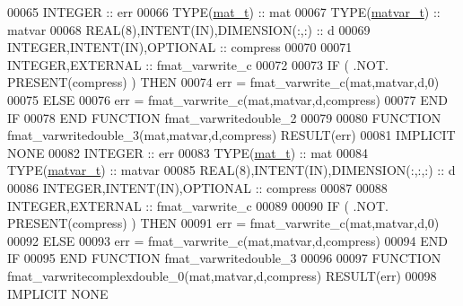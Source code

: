 \begin{DoxyCode}
00065     \textcolor{keywordtype}{INTEGER}                                  :: err
00066     \textcolor{keywordtype}{TYPE}(\hyperlink{group___m_a_t_gab0fc888f5a5d79943b16284b1f91c2e8}{mat\_t})                              :: mat
00067     \textcolor{keywordtype}{TYPE}(\hyperlink{group___m_a_t_structmatvar__t}{matvar\_t})                           :: matvar
00068     \textcolor{keywordtype}{REAL(8)},\textcolor{keywordtype}{INTENT(IN)},\textcolor{keywordtype}{DIMENSION(:,:)}        :: d
00069     \textcolor{keywordtype}{INTEGER},\textcolor{keywordtype}{INTENT(IN)},\textcolor{keywordtype}{OPTIONAL}              :: compress
00070 
00071     \textcolor{keywordtype}{INTEGER},\textcolor{keywordtype}{EXTERNAL}                         :: fmat\_varwrite\_c
00072 
00073     \textcolor{keywordflow}{IF} ( .NOT. \textcolor{keyword}{PRESENT}(compress) ) \textcolor{keywordflow}{THEN}
00074         err = fmat\_varwrite\_c(mat,matvar,d,0)
00075     \textcolor{keywordflow}{ELSE}
00076         err = fmat\_varwrite\_c(mat,matvar,d,compress)
00077 \textcolor{keywordflow}{    END IF}
00078 \textcolor{keyword}{END FUNCTION }fmat\_varwritedouble\_2
00079 
00080 \textcolor{keyword}{FUNCTION }fmat\_varwritedouble\_3(mat,matvar,d,compress) \textcolor{keyword}{RESULT}(err)
00081 \textcolor{keywordtype}{IMPLICIT NONE}
00082     \textcolor{keywordtype}{INTEGER}                                  :: err
00083     \textcolor{keywordtype}{TYPE}(\hyperlink{group___m_a_t_gab0fc888f5a5d79943b16284b1f91c2e8}{mat\_t})                              :: mat
00084     \textcolor{keywordtype}{TYPE}(\hyperlink{group___m_a_t_structmatvar__t}{matvar\_t})                           :: matvar
00085     \textcolor{keywordtype}{REAL(8)},\textcolor{keywordtype}{INTENT(IN)},\textcolor{keywordtype}{DIMENSION(:,:,:)}      :: d
00086     \textcolor{keywordtype}{INTEGER},\textcolor{keywordtype}{INTENT(IN)},\textcolor{keywordtype}{OPTIONAL}              :: compress
00087 
00088     \textcolor{keywordtype}{INTEGER},\textcolor{keywordtype}{EXTERNAL}                         :: fmat\_varwrite\_c
00089 
00090     \textcolor{keywordflow}{IF} ( .NOT. \textcolor{keyword}{PRESENT}(compress) ) \textcolor{keywordflow}{THEN}
00091         err = fmat\_varwrite\_c(mat,matvar,d,0)
00092     \textcolor{keywordflow}{ELSE}
00093         err = fmat\_varwrite\_c(mat,matvar,d,compress)
00094 \textcolor{keywordflow}{    END IF}
00095 \textcolor{keyword}{END FUNCTION }fmat\_varwritedouble\_3
00096 
00097 \textcolor{keyword}{FUNCTION }fmat\_varwritecomplexdouble\_0(mat,matvar,d,compress) \textcolor{keyword}{RESULT}(err)
00098 \textcolor{keywordtype}{IMPLICIT NONE}

\end{DoxyCode}
